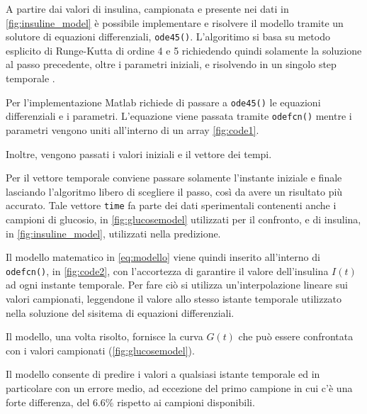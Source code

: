 A partire dai valori di insulina, campionata e presente nei dati in \cref{fig:insuline_model} è possibile implementare e risolvere il modello tramite un solutore di equazioni differenziali, \texttt{ode45()}. L'algoritimo si basa su metodo esplicito di Runge-Kutta di ordine 4 e 5 richiedendo quindi solamente la soluzione al passo precedente, oltre i parametri iniziali, e risolvendo in un singolo step temporale \cite{ode45}.

Per l'implementazione Matlab richiede di passare a \texttt{ode45()} le equazioni differenziali e i parametri. L'equazione viene passata tramite \texttt{odefcn()} mentre i parametri vengono uniti all'interno di un array \cref{fig:code1}. 

Inoltre, vengono passati i valori iniziali e il vettore dei tempi. 

Per il vettore temporale conviene passare solamente l'instante iniziale e finale lasciando l'algoritmo libero di scegliere il passo, così da avere un risultato più accurato. Tale vettore \texttt{time} fa parte dei dati sperimentali contenenti anche i campioni di glucosio, in \cref{fig:glucosemodel} utilizzati per il confronto, e di insulina, in \cref{fig:insuline_model}, utilizzati nella predizione.

Il modello matematico in \cref{eq:modello} viene quindi inserito all'interno di \texttt{odefcn()}, in \cref{fig:code2}, con l'accortezza di garantire il valore dell'insulina $I(t)$ ad ogni instante temporale. Per fare ciò si utilizza un'interpolazione lineare sui valori campionati, leggendone il valore allo stesso istante temporale utilizzato nella soluzione del sisitema di equazioni differenziali.



Il modello, una volta risolto, fornisce la curva $G(t)$ che può essere confrontata con i valori campionati (\cref{fig:glucosemodel}). 

Il modello consente di predire i valori a qualsiasi istante temporale ed in particolare con un errore medio, ad eccezione del primo campione in cui c'è una forte differenza, del 6.6\% rispetto ai campioni disponibili.


